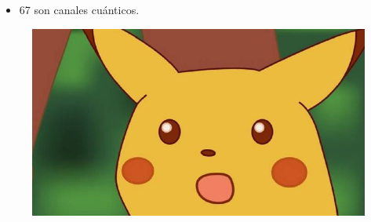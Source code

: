 \documentclass[11pt,xcolor=dvipsnames]{beamer}
\begin{document}
\begin{frame}
	\begin{itemize}[label=$\textcolor{Blue}{\blacktriangleright}$]
		\item 67 son canales cuánticos.
	\end{itemize}
	\begin{figure}
		\centering 
		\includegraphics[height=0.6\textheight]{img-congreso/surprised}
	\end{figure}
\end{frame}
\end{document}
